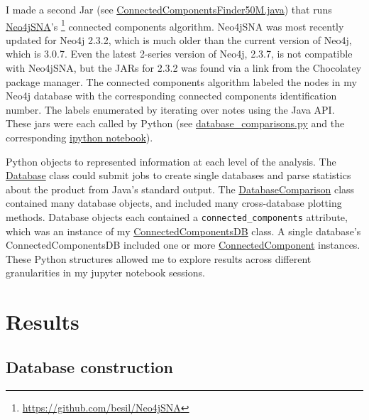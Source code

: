\documentclass[12pt]{article}
\begin{document}
I made a second Jar (see \href{https://github.com/JanetMatsen/Neo4j_meta4/blob/master/data_mining_Neo4j_v2_3_2/src/ConnectedComponentsFinder50M.java}{ConnectedComponentsFinder50M.java}) that runs \href{https://github.com/besil/Neo4jSNA}{Neo4jSNA}'s \footnote{\url{https://github.com/besil/Neo4jSNA}} connected components algorithm.
Neo4jSNA was most recently updated for Neo4j 2.3.2, which is much older than the current version of Neo4j, which is 3.0.7. 
Even the latest 2-series version of Neo4j, 2.3.7, is not compatible with Neo4jSNA, but the JARs for 2.3.2 was found via a link from the Chocolatey package manager.
The connected components algorithm labeled the nodes in my Neo4j database with the corresponding connected components identification number.
The labels enumerated by iterating over notes using the Java API.
These jars were each called by Python (see \href{https://github.com/JanetMatsen/Neo4j_meta4/blob/master/code/database_comparisons.py}{database\_comparisons.py} and the corresponding \href{https://github.com/JanetMatsen/Neo4j_meta4/blob/master/jupyter/build_graphs_and_find_connected_components_50M.ipynb}{ipython notebook}).


Python objects to represented information at each level of the analysis.  
The \href{https://github.com/JanetMatsen/Neo4j_meta4/blob/master/code/database_comparisons.py}{Database} class could submit jobs to create single databases and parse statistics about the product from Java's standard output.
The \href{https://github.com/JanetMatsen/Neo4j_meta4/blob/master/code/database_comparisons.py}{DatabaseComparison} class contained many database objects, and included many cross-database plotting methods.
Database objects each contained a \texttt{connected\_components} attribute, which was an instance of my \href{https://github.com/JanetMatsen/Neo4j_meta4/blob/master/code/connected_component.py}{ConnectedComponentsDB} class.
A single database's ConnectedComponentsDB included one or more \href{https://github.com/JanetMatsen/Neo4j_meta4/blob/master/code/connected_component.py}{ConnectedComponent} instances.
These Python structures allowed me to explore results across different granularities in my jupyter notebook sessions.

\section{Results}  

\subsection{Database construction}
\end{document}
